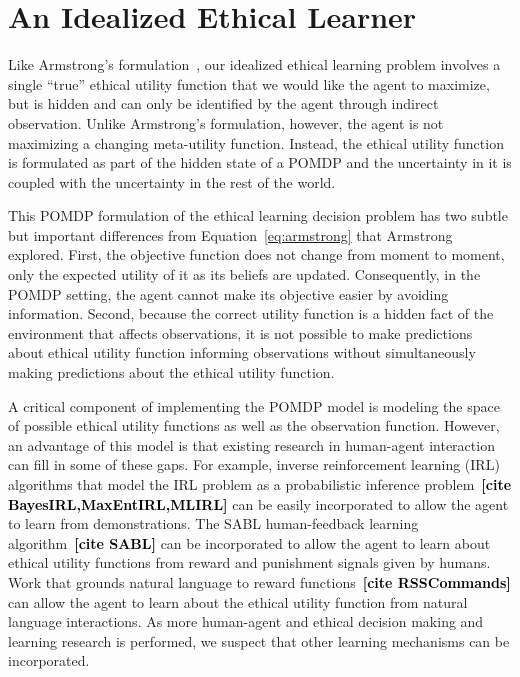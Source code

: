 \documentclass[11pt]{article}
\newcommand\davenote[1]{\textcolor{blue}{Dave: #1}}
\newcommand\ncitea[1]{\textcolor{black}{{\bf [cite #1]}}}
\begin{document}

\section{An Idealized Ethical Learner}
Like Armstrong's formulation~, our idealized ethical learning problem involves a single ``true'' ethical utility function that we would like the agent to maximize, but is hidden and can only be identified by the agent through indirect observation. Unlike Armstrong's formulation, however, the agent is not maximizing a changing meta-utility function. Instead, the ethical utility function is formulated as part of the hidden state of a POMDP and the uncertainty in it is coupled with the uncertainty in the rest of the world.

This POMDP formulation of the ethical learning decision problem has two subtle but important differences from Equation~\ref{eq:armstrong} that Armstrong explored. First, the objective function does not change from moment to moment, only the expected utility of it as its beliefs are updated. Consequently, in the POMDP setting, the agent cannot make its objective easier by avoiding information. Second, because the correct utility function is a hidden fact of the environment that affects observations, it is not possible to make predictions about ethical utility function informing observations without simultaneously making predictions about the ethical utility function.

A critical component of implementing the POMDP model is modeling the space of possible ethical utility functions as well as the observation function. However, an advantage of this model is that existing research in human-agent interaction can fill in some of these gaps. For example, inverse reinforcement learning (IRL) algorithms that model the IRL problem as a probabilistic inference problem~\ncitea{BayesIRL,MaxEntIRL,MLIRL} can be easily incorporated to allow the agent to learn from demonstrations. The SABL human-feedback learning algorithm~\ncitea{SABL} can be incorporated to allow the agent to learn about ethical utility functions from reward and punishment signals given by humans. Work that grounds natural language to reward functions~\ncitea{RSSCommands} can allow the agent to learn about the ethical utility function from natural language interactions. As more human-agent and ethical decision making and learning research is performed, we suspect that other learning mechanisms can be incorporated.
\end{document}
